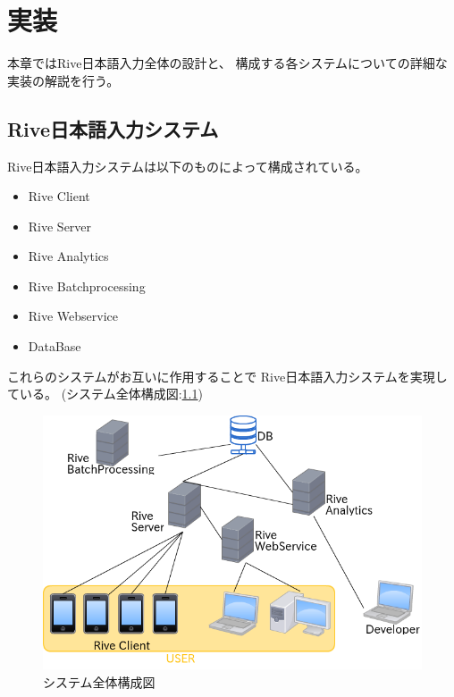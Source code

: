\chapter{実装}
\label{chap:implementation}
本章ではRive日本語入力全体の設計と、
構成する各システムについての詳細な実装の解説を行う。

\newpage
\section{Rive日本語入力システム}
Rive日本語入力システムは以下のものによって構成されている。
\begin{itemize}
  \item Rive Client
  \item Rive Server
  \item Rive Analytics
  \item Rive Batchprocessing
  \item Rive Webservice
  \item DataBase
\end{itemize}
これらのシステムがお互いに作用することで
Rive日本語入力システムを実現している。
(システム全体構成図:\ref{fig:systemstructure})
\begin{figure}[htbp]
  \begin{center}
    \includegraphics[width=120mm,bb=0 0 540 448]{images/systemstructure.png}
  \end{center}
  \caption{システム全体構成図}
  \label{fig:systemstructure}
\end{figure}

